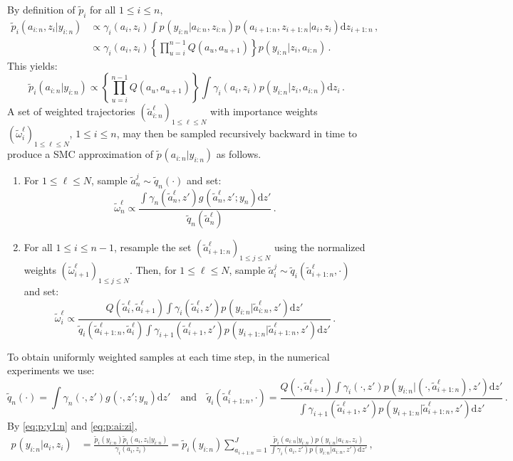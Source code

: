 \documentclass[nolayout]{article}
\theoremstyle{plain}
\theoremstyle{definition}
\newcommand{\1}{\mathbbm{1}}
\def\rmd{\mathrm{d}}
\def\eqsp{\,}
\begin{document}
By definition of $\tilde{p}_i$ for all $1\le i \le n$,
\begin{align*}
\tilde{p}_{i}(a_{i:n},z_i|y_{i:n}) &\propto \gamma^{}_{i}(a_i,z_i) \int p_{}(y_{i:n}|a_{i:n},z_{i:n})p_{}(a_{i+1:n},z_{i+1:n}|a_i,z_i)\rmd z_{i+1:n}\eqsp,\\
&\propto\gamma^{}_{i}(a_i,z_i)\left\{\prod_{u=i}^{n-1}Q(a_u,a_{u+1})\right\}p(y_{i:n}|z_i,a_{i:n})\eqsp.
\end{align*}
This yields:
\[
\tilde{p}_{i}(a_{i:n}|y_{i:n}) \propto \left\{\prod_{u=i}^{n-1}Q(a_u,a_{u+1})\right\} \int \gamma^{}_{i}(a_i,z_i) p(y_{i:n}|z_i,a_{i:n})\rmd z_i\eqsp.
\]
A set of weighted trajectories $(\tilde{a}^\ell_{i:n})_{1\le \ell\le N}$ with importance weights $(\tilde{\omega}^\ell_i)_{1\le \ell\le N}$, $1\le i \le n$, may then be sampled recursively backward in time to produce a SMC approximation of $\tilde{p}_{}(a_{i:n}|y_{i:n})$ as follows.
\begin{enumerate}[-]
\item For $1\le \ell \le N$, sample $\tilde{a}^{j}_n\sim\tilde{q}_n(\cdot)$ and set:
\[
\tilde{\omega}^{\ell}_n \propto \frac{\int\gamma^{}_n(\tilde{a}^{\ell}_n,z')g_{}(\tilde{a}^{\ell}_n,z';y_n)\rmd z'}{\tilde{q}_n(\tilde{a}^{\ell}_n)}\eqsp.
\]
\item For all $1\le i \le n-1$, resample the set $(\tilde{a}^{\ell}_{i+1:n})_{1\le j\le N}$ using the normalized weights $(\tilde{\omega}^{\ell}_{i+1})_{1\le j \le N}$. Then, for $1\le \ell \le N$, sample $\tilde{a}^{j}_{i}\sim\tilde{q}_i(\tilde{a}^{\ell}_{i+1:n},\cdot)$  and set:
\[
\tilde{\omega}^{\ell}_i \propto \frac{Q(\tilde{a}^{\ell}_i,\tilde{a}^{\ell}_{i+1})\int \gamma^{}_i(\tilde{a}^{\ell}_i,z')p_{}(y_{i:n}|\tilde{a}^{\ell}_{i:n},z')\rmd z'}{\tilde{q}_i(\tilde{a}^{\ell}_{i+1:n},\tilde{a}^{\ell}_i)\int \gamma^{}_{i+1}(\tilde{a}^{\ell}_{i+1},z')p_{}(y_{i+1:n}|\tilde{a}^{\ell}_{i+1:n},z')\rmd z'}\eqsp.
\]
\end{enumerate}
To obtain uniformly weighted samples at each time step, in the numerical experiments we use:
\[
\tilde{q}_n(\cdot) = \int\gamma^{}_n(\cdot,z')g_{}(\cdot,z';y_n)\rmd z'\quad\mbox{and}\quad \tilde{q}_i(\tilde{a}^{\ell}_{i+1:n},\cdot) = \frac{Q(\cdot,\tilde{a}^{\ell}_{i+1})\int \gamma^{}_i(\cdot,z')p_{}(y_{i:n}|(\cdot,\tilde{a}^{\ell}_{i+1:n}),z')\rmd z'}{\int \gamma^{}_{i+1}(\tilde{a}^{\ell}_{i+1},z')p_{}(y_{i+1:n}|\tilde{a}^{\ell}_{i+1:n},z')\rmd z'}\eqsp.
\]
By \eqref{eq:p:y1:n} and \eqref{eq:p:ai:zi}, 
\begin{align*}
p_{}(y_{i:n}|a_i,z_i)
&= \frac{\tilde{p}_{i}(y_{i:n})  \tilde{p}_{i}(a_i,z_i|y_{i:n})}{\gamma^{}_{i}(a_i,z_i)}= \tilde{p}_{i}(y_{i:n})  \sum_{a_{i+1:n}=1}^J\frac{\tilde{p}_{i}(a_{i:n}|y_{i:n})p_{}(y_{i:n}|a_{i:n},z_{i})}{\int \gamma^{}_{i}(a_i,z')p_{}(y_{i:n}|a_{i:n},z')\rmd z'}\label{eq:p:ai:zi}\eqsp,
\end{align*}
\end{document}
